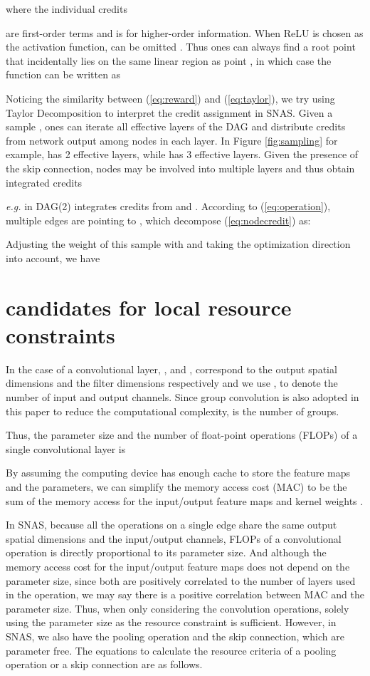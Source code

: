\documentclass{article} \usepackage{iclr2019_conference,times}
\newcommand{\zh}{\color{black}}
\begin{document}
where the individual credits

are first-order terms and  is for higher-order information. When ReLU is chosen as the activation function,  can be omitted \citep{montavon2017methods}. Thus ones can always find a root point  that incidentally lies on the same linear region as point , in which case the function can be written as


Noticing the similarity between (\ref{eq:reward}) and (\ref{eq:taylor}), we try using Taylor Decomposition to interpret the credit assignment in SNAS. Given a sample , ones can iterate all effective layers of the DAG and distribute credits from network output  among nodes  in each layer. In Figure \ref{fig:sampling} for example,  has 2 effective layers, while  has 3 effective layers. Given the presence of the skip connection, nodes may be involved into multiple layers and thus obtain integrated credits
 
\textit{e.g.}  in DAG(2) integrates credits from  and . According to (\ref{eq:operation}), {\zh multiple} edges  are pointing to , which decompose (\ref{eq:nodecredit}) as:

Adjusting the weight of this sample with  and taking the optimization direction into account, we have


\section{candidates for local resource constraints}

In the case of a convolutional layer, ,  and ,  correspond to the output spatial dimensions and the filter dimensions respectively and we use ,  to denote the number of input and output channels. Since group convolution is also adopted in this paper to reduce the computational complexity,  is the number of groups.

Thus, the parameter size and the number of float-point operations (FLOPs) of a single convolutional layer is




By assuming the computing device has enough cache to store the feature maps and the parameters, we can simplify the memory access cost (MAC) to be the sum of the memory access for the input/output feature maps and kernel weights \citep{ma2018shufflenet}.


In SNAS, because all the operations on a single edge share the same output spatial dimensions and the input/output channels, FLOPs of a convolutional operation is directly proportional to its parameter size. And although the memory access cost for the input/output feature maps  does not depend on the parameter size, since both are positively correlated to the number of layers used in the operation, we may say there is a positive correlation between MAC and the parameter size. Thus, when only considering the convolution operations, solely using the parameter size as the resource constraint is sufficient. However, in SNAS, we also have the pooling operation and the skip connection, which are parameter free. The equations to calculate the resource criteria of a pooling operation or a skip connection are as follows.
\end{document}
